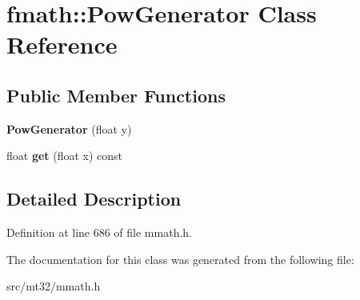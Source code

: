 \hypertarget{classfmath_1_1PowGenerator}{\section{fmath\-:\-:Pow\-Generator Class Reference}
\label{classfmath_1_1PowGenerator}
}
\subsection*{Public Member Functions}
\begin{DoxyCompactItemize}
\item 
\hypertarget{classfmath_1_1PowGenerator_ad264a37bf0972ce6ec6b8b51725ea743}{{\bfseries Pow\-Generator} (float y)}\label{classfmath_1_1PowGenerator_ad264a37bf0972ce6ec6b8b51725ea743}

\item 
\hypertarget{classfmath_1_1PowGenerator_a9b1ed1a1be122e02377c59d7e5d87f37}{float {\bfseries get} (float x) const }\label{classfmath_1_1PowGenerator_a9b1ed1a1be122e02377c59d7e5d87f37}

\end{DoxyCompactItemize}


\subsection{Detailed Description}


Definition at line 686 of file mmath.\-h.



The documentation for this class was generated from the following file\-:\begin{DoxyCompactItemize}
\item 
src/mt32/mmath.\-h\end{DoxyCompactItemize}
